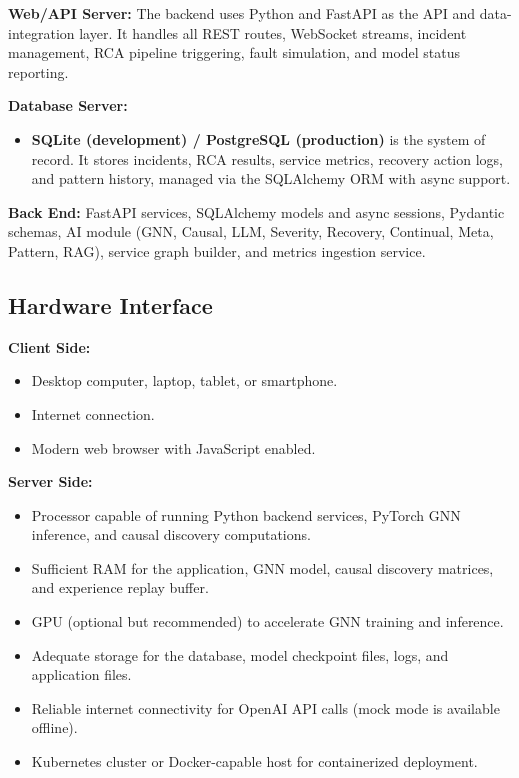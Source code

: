 \documentclass[11pt,a4paper]{article}
\begin{document}
\textbf{Web/API Server:}
The backend uses Python and FastAPI as the API and data-integration layer. It handles all REST routes, WebSocket streams, incident management, RCA pipeline triggering, fault simulation, and model status reporting.

\textbf{Database Server:}
\begin{itemize}
    \item \textbf{SQLite (development) / PostgreSQL (production)} is the system of record. It stores incidents, RCA results, service metrics, recovery action logs, and pattern history, managed via the SQLAlchemy ORM with async support.
\end{itemize}

\textbf{Back End:}
FastAPI services, SQLAlchemy models and async sessions, Pydantic schemas, AI module (GNN, Causal, LLM, Severity, Recovery, Continual, Meta, Pattern, RAG), service graph builder, and metrics ingestion service.


\subsection{Hardware Interface}

\textbf{Client Side:}
\begin{itemize}
    \item Desktop computer, laptop, tablet, or smartphone.
    \item Internet connection.
    \item Modern web browser with JavaScript enabled.
\end{itemize}

\textbf{Server Side:}
\begin{itemize}
    \item Processor capable of running Python backend services, PyTorch GNN inference, and causal discovery computations.
    \item Sufficient RAM for the application, GNN model, causal discovery matrices, and experience replay buffer.
    \item GPU (optional but recommended) to accelerate GNN training and inference.
    \item Adequate storage for the database, model checkpoint files, logs, and application files.
    \item Reliable internet connectivity for OpenAI API calls (mock mode is available offline).
    \item Kubernetes cluster or Docker-capable host for containerized deployment.
\end{itemize}
\end{document}
